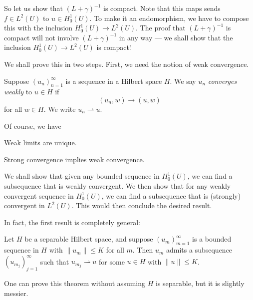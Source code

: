 \documentclass[a4paper]{article}
\begin{document}
So let us show that $(L + \gamma)^{-1}$ is compact. Note that this maps sends $f \in L^2(U)$ to $u \in H_0^1(U)$. To make it an endomorphism, we have to compose this with the inclusion $H_0^1(U) \to L^2(U)$. The proof that $(L + \gamma)^{-1}$ is compact will not involve $(L + \gamma)^{-1}$ in any way --- we shall show that the inclusion $H_0^1(U) \to L^2(U)$ is compact!

We shall prove this in two steps. First, we need the notion of weak convergence.

\begin{defi}
  Suppose $(u_n)_{n = 1}^\infty$ is a sequence in a Hilbert space $H$. We say $u_n$ \emph{converges weakly} to $u \in H$ if
  \[
    (u_n, w) \to (u, w)
  \]
  for all $w \in H$. We write $u_n \rightharpoonup u$.
\end{defi}

Of course, we have
\begin{lemma}
  Weak limits are unique.\qedsym
\end{lemma}

\begin{lemma}
  Strong convergence implies weak convergence.\qedsym
\end{lemma}

We shall show that given any bounded sequence in $H_0^1(U)$, we can find a subsequence that is weakly convergent. We then show that for any weakly convergent sequence in $H_0^1(U)$, we can find a subsequence that is (strongly) convergent in $L^2(U)$. This would then conclude the desired result.

In fact, the first result is completely general:
\begin{thm}
  Let $H$ be a separable Hilbert space, and suppose $(u_m)_{m = 1}^\infty$ is a bounded sequence in $H$ with $\|u_m\| \leq K$ for all $m$. Then $u_m$ admits a subsequence $(u_{m_j})_{j = 1}^\infty$ such that $u_{m_j} \rightharpoonup u$ for some $u \in H$ with $\|u\| \leq K$.
\end{thm}
One can prove this theorem without assuming $H$ is separable, but it is slightly messier.
\end{document}
